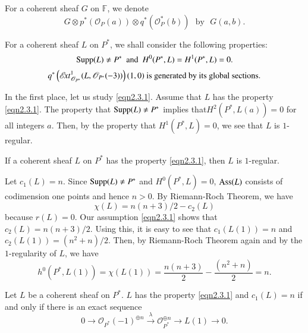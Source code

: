 \setcounter{dfn}{1}
\begin{notation}\label{notation2.2}
For a coherent sheaf $G$ on $\mathbb{F}$, we denote 
$$
G\otimes p^{\ast}(\mathscr{O}_P(a))\otimes
q^{\ast}(\mathscr{O}_P^{\ast}(b))\text{~ by~ } G(a,b).
$$
\end{notation}

For a coherent sheaf $L$ on $P^{\ast}$, we shall consider the
following properties:
\setcounter{dfn}{3}
\setcounter{equation}{0}
\begin{equation}\label{eqn2.3.1}
\mathrm{Supp} (L)\neq P^{\ast}\text{~ and~ } H^{0}(P^{\ast},L)=H^{1}(P^{\ast},L)=0.
\end{equation}
\begin{equation}\label{eqn2.3.2}
q^{\ast}\left(\mathscr{E}\!{\it xt}^{1}_{\mathscr{O}_{P^{\ast}}}(L,\mathscr{O}_{P^{\ast}}(-3))\right)(1,0)
\text{ is generated by its global sections.}
\end{equation}

In the first place, let us study \eqref{eqn2.3.1}. Assume that $L$ has
the property \eqref{eqn2.3.1}. The property that $\mathrm{Supp}(L)\neq
P^{\ast}$ implies that\pageoriginale $H^{2}(P^{\ast},L(a))=0$ for all integers
$a$. Then, by the property that $H^{1}(P^{\ast},L)=0$, we see that $L$
is $1$-regular.

\begin{lemma}\label{lemma2.4}
If a coherent sheaf $L$ on $P^{\ast}$ has the property
\eqref{eqn2.3.1}, then $L$ is $1$-regular.
\end{lemma}

Let $c_1(L)=n$. Since $\mathrm{Supp}(L)\neq P^{\ast}$ and
$H^{0}(P^{\ast},L)=0$, $\mathrm{Ass}(L)$ consists of codimension one points and
hence $n>0$. By Riemann-Roch Theorem, we have 
$$
\chi (L)=n(n+3)/2-c_2(L)
$$
because $r(L)=0$. Our assumption \eqref{eqn2.3.1} shows that
$c_2(L)=n(n+3)/2$. Using this, it is easy to see that
$c_1(L(1))=n$ and $c_2(L(1))=\left(n^{2}+n\right)/2$. Then, by
Riemann-Roch Theorem again and by the $1$-regularity of $L$, we have 
$$
h^{0}\left(P^{\ast},L(1)\right)=\chi (L(1))=\dfrac{n(n+3)}{2}-\dfrac{(n^{2}+n)}{2}=n.
$$

\begin{Prop}\label{Prop2.5}
Let $L$ be a coherent sheaf on $P^{\ast}$. $L$ has the property
\eqref{eqn2.3.1} and $c_1(L)=n$ if and only if there is an exact sequence
\setcounter{equation}{0}
\begin{equation}\label{eqn2.5.1}
0\to\mathscr{O}_{P^{\ast}}(-1)^{\oplus
  n}\xrightarrow{\lambda}\mathscr{O}_{P^{\ast}}^{\oplus n}\to L(1)\to 0.
\end{equation}
\end{Prop}

